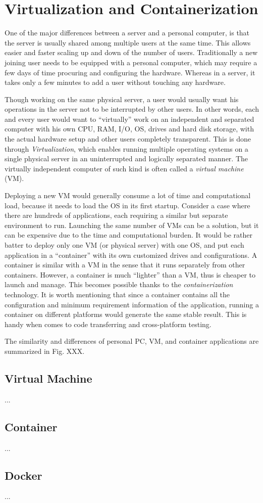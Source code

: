 \chapter{Virtualization and Containerization}

One of the major differences between a server and a personal computer, is that the server is usually shared among multiple users at the same time. This allows easier and faster scaling up and down of the number of users. Traditionally a new joining user needs to be equipped with a personal computer, which may require a few days of time procuring and configuring the hardware. Whereas in a server, it takes only a few minutes to add a user without touching any hardware.

Though working on the same physical server, a user would usually want his operations in the server not to be interrupted by other users. In other words, each and every user would want to ``virtually'' work on an independent and separated computer with his own CPU, RAM, I/O, OS, drives and hard disk storage, with the actual hardware setup and other users completely transparent. This is done through \textit{Virtualization}, which enables running multiple operating systems on a single physical server in an uninterrupted and logically separated manner. The virtually independent computer of such kind is often called a \textit{virtual machine} (VM).

Deploying a new VM would generally consume a lot of time and computational load, because it needs to load the OS in its first startup. Consider a case where there are hundreds of applications, each requiring a similar but separate environment to run. Launching the same number of VMs can be a solution, but it can be expensive due to the time and computational burden. It would be rather batter to deploy only one VM (or physical server) with one OS, and put each application in a ``container'' with its own customized drives and configurations. A container is similar with a VM in the sense that it runs separately from other containers. However, a container is much ``lighter'' than a VM, thus is cheaper to launch and manage. This becomes possible thanks to the \textit{containerization} technology. It is worth mentioning that since a container contains all the configuration and minimum requirement information of the application, running a container on different platforms would generate the same stable result. This is handy when comes to code transferring and cross-platform testing.

The similarity and differences of personal PC, VM, and container applications are summarized in Fig. XXX.

\section{Virtual Machine}
...
\section{Container}
...
\section{Docker}
... 